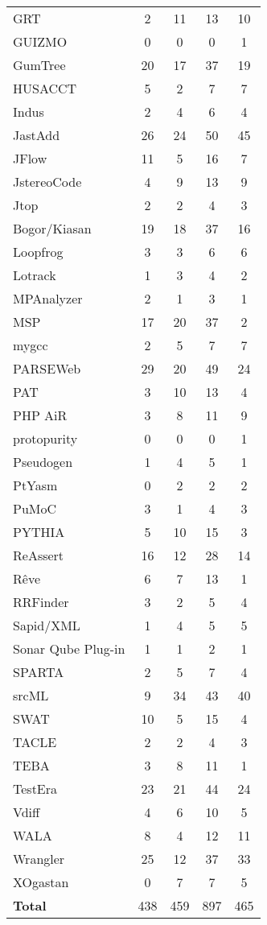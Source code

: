 \begin{longtable}{ l c c c c }
   GRT & 2 & 11 & 13 & 10 \\
   GUIZMO & 0 & 0 & 0 & 1 \\
   GumTree & 20 & 17 & 37 & 19 \\
   HUSACCT & 5 & 2 & 7 & 7 \\
   Indus & 2 & 4 & 6 & 4 \\
   JastAdd & 26 & 24 & 50 & 45 \\
   JFlow & 11 & 5 & 16 & 7 \\
   JstereoCode & 4 & 9 & 13 & 9 \\
   Jtop & 2 & 2 & 4 & 3 \\
   Bogor/Kiasan & 19 & 18 & 37 & 16 \\
   Loopfrog & 3 & 3 & 6 & 6 \\
   Lotrack & 1 & 3 & 4 & 2 \\
   MPAnalyzer & 2 & 1 & 3 & 1 \\
   MSP & 17 & 20 & 37 & 2 \\
   mygcc & 2 & 5 & 7 & 7 \\
   PARSEWeb & 29 & 20 & 49 & 24 \\
   PAT & 3 & 10 & 13 & 4 \\
   PHP AiR & 3 & 8 & 11 & 9 \\
   protopurity & 0 & 0 & 0 & 1 \\
   Pseudogen & 1 & 4 & 5 & 1 \\
   PtYasm & 0 & 2 & 2 & 2 \\
   PuMoC & 3 & 1 & 4 & 3 \\
   PYTHIA & 5 & 10 & 15 & 3 \\
   ReAssert & 16 & 12 & 28 & 14 \\
   Rêve & 6 & 7 & 13 & 1 \\
   RRFinder & 3 & 2 & 5 & 4 \\
   Sapid/XML & 1 & 4 & 5 & 5 \\
   Sonar Qube Plug-in & 1 & 1 & 2 & 1 \\
   SPARTA & 2 & 5 & 7 & 4 \\
   srcML & 9 & 34 & 43 & 40 \\
   SWAT & 10 & 5 & 15 & 4 \\
   TACLE & 2 & 2 & 4 & 3 \\
   TEBA & 3 & 8 & 11 & 1 \\
   TestEra & 23 & 21 & 44 & 24 \\
   Vdiff & 4 & 6 & 10 & 5 \\
   WALA & 8 & 4 & 12 & 11 \\
   Wrangler & 25 & 12 & 37 & 33 \\
   XOgastan & 0 & 7 & 7 & 5 \\
  \hline
  {\bf Total} & 438 & 459 & 897 & 465 \\
\end{longtable}

